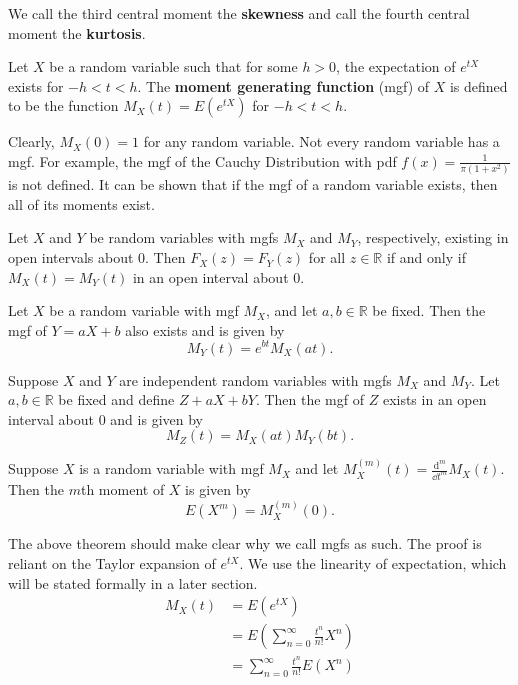 We call the third central moment the \textbf{skewness} and call the fourth central moment the \textbf{kurtosis}.

\begin{definition}[mgf]
	Let $X$ be a random variable such that for some $h>0$, the expectation of $e^{tX}$ exists for $-h<t<h$. The \textbf{moment generating function} (mgf) of $X$ is defined to be the function $M_X(t)=E(e^{tX})$ for $-h<t<h$.
\end{definition}

Clearly, $M_X(0)=1$ for any random variable. Not every random variable has a mgf. For example, the mgf of the Cauchy Distribution with pdf $f(x)=\frac{1}{\pi(1+x^2)}$ is not defined. It can be shown that if the mgf of a random variable exists, then all of its moments exist.

\begin{theorem}[]
	Let $X$ and $Y$ be random variables with mgfs $M_X$ and $M_Y$, respectively, existing in open intervals about 0. Then $F_X(z)=F_Y(z)$ for all $z\in\mathbb R$ if and only if $M_X(t)=M_Y(t)$ in an open interval about 0.
\end{theorem}

\begin{theorem}[]
	Let $X$ be a random variable with mgf $M_X$, and let $a,b\in\mathbb R$ be fixed. Then the mgf of $Y=aX+b$ also exists and is given by $$M_Y(t)=e^{bt}M_X(at).$$
\end{theorem}

\begin{theorem}[]
	Suppose $X$ and $Y$ are independent random variables with mgfs $M_X$ and $M_Y$. Let $a,b\in\mathbb R$ be fixed and define $Z+aX+bY$. Then the mgf of $Z$ exists in an open interval about 0 and is given by
	$$M_Z(t)=M_X(at)M_Y(bt).$$
\end{theorem}

\begin{theorem}[]
	Suppose $X$ is a random variable with mgf $M_X$ and let $M_X^{(m)}(t)=\frac{\mathrm{d}^m}{\dd t^m}M_X(t)$. Then the $m$th moment of $X$ is given by $$E(X^m)=M_X^{(m)}(0).$$
\end{theorem}

The above theorem should make clear why we call mgfs as such. The proof is reliant on the Taylor expansion of $e^{tX}$. We use the linearity of expectation, which will be stated formally in a later section.
\begin{align*}
	M_X(t)&=E(e^{tX})\\
	&=E\left(\sum_{n=0}^\infty \frac{t^n}{n!}X^n\right)\\
	&=\sum_{n=0}^\infty \frac{t^n}{n!}E(X^n)
\end{align*}

